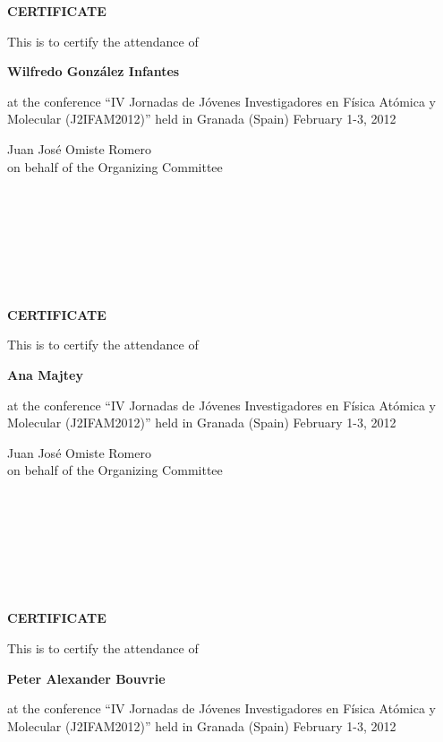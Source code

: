 \documentclass [13pt,a4paper] {letter}
\begin{document}
\pagestyle{empty}
\begin{center}
{\bf {\Huge CERTIFICATE}}

\vspace {1.5cm}
This is to certify the attendance of
\vspace {1cm}

{\bf \Large  Wilfredo    González Infantes }
\vspace {1cm}

at the conference { \textquotedblleft IV Jornadas de Jóvenes Investigadores en Física Atómica y Molecular (J2IFAM2012)\textquotedblright} 
held in Granada (Spain) February 1-3, 2012
\end{center}
\vspace {4cm}
\begin{raggedleft}
Juan José Omiste Romero\\
on behalf of the Organizing Committee
\newpage
\end{raggedleft}
\begin{verbatim}







\end{verbatim}
\pagestyle{empty}
\begin{center}
{\bf {\Huge CERTIFICATE}}

\vspace {1.5cm}
This is to certify the attendance of
\vspace {1cm}

{\bf \Large  Ana    Majtey }
\vspace {1cm}

at the conference { \textquotedblleft IV Jornadas de Jóvenes Investigadores en Física Atómica y Molecular (J2IFAM2012)\textquotedblright} 
held in Granada (Spain) February 1-3, 2012
\end{center}
\vspace {4cm}
\begin{raggedleft}
Juan José Omiste Romero\\
on behalf of the Organizing Committee
\newpage
\end{raggedleft}
\begin{verbatim}







\end{verbatim}
\pagestyle{empty}
\begin{center}
{\bf {\Huge CERTIFICATE}}

\vspace {1.5cm}
This is to certify the attendance of
\vspace {1cm}

{\bf \Large  Peter  Alexander  Bouvrie }
\vspace {1cm}

at the conference { \textquotedblleft IV Jornadas de Jóvenes Investigadores en Física Atómica y Molecular (J2IFAM2012)\textquotedblright} 
held in Granada (Spain) February 1-3, 2012
\end{center}
\end{document}

